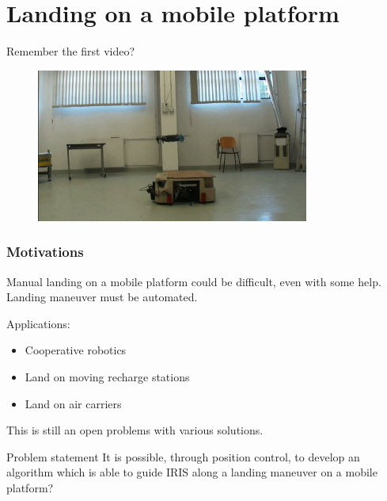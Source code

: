 \documentclass[xcolor=dvipsnames]{beamer}
\begin{document}

\section{Landing on a mobile platform}

\begin{frame}
\tableofcontents[sectionstyle=show,square,currentsection]
\end{frame}

\begin{frame}[t]
Remember the first video?

\vspace{2em}
\begin{figure}
\centering
\includegraphics[width = 0.8\textwidth]{f/intro.png}
\end{figure}

\end{frame}


\begin{frame}
\frametitle{Motivations}
Manual landing on a mobile platform could be difficult, even with some help. Landing maneuver must be automated.
\vspace{2ex}

Applications: \begin{itemize}
\item Cooperative robotics
\item Land on moving recharge stations
\item Land on air carriers
\end{itemize}
This is still an open problems with various solutions.
\vspace{2ex}
\begin{block}{Problem statement}
It is possible, through position control, to develop an algorithm which is able to guide IRIS along a landing maneuver on a mobile platform?
\end{block}
\end{frame}
\end{document}
